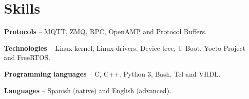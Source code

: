 \section{Skills}
\begin{small}
	\parbox[t][][t]{\linewidth}{
		\textbf{Protocols} -- {MQTT, ZMQ, RPC, OpenAMP and Protocol Buffers.}
		\bigbreak
	}
	\parbox[t][][t]{\linewidth}{
		\textbf{Technologies} -- {Linux kernel, Linux drivers, Device tree, U-Boot, Yocto Project and FreeRTOS.}
		\bigbreak
	}
	\parbox[t][][t]{\linewidth}{
		\textbf{Programming languages} -- {C, C++, Python 3, Bash, Tcl and VHDL.}
		\bigbreak
	}
	\parbox[t][][t]{\linewidth}{
		\textbf{Languages} -- {Spanish (native) and English (advanced).}
		\bigbreak
	}
\end{small}

